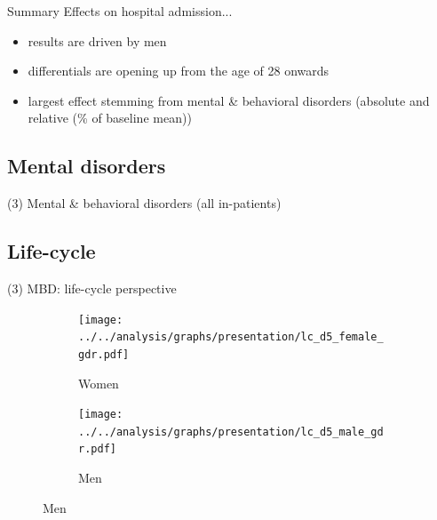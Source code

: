 \documentclass[aspectratio=169,handout]{beamer} %
\begin{document}
\begin{frame}{Summary}
Effects on hospital admission...
	\begin{itemize}	
		\item results are driven by men
		\item differentials are opening up from the age of 28 onwards
		\item largest effect stemming from mental \& behavioral disorders (absolute and relative (\% of baseline mean))
	\end{itemize}	
\end{frame}



\subsection{Mental disorders}\label{MBD_TAB_TOTAL}
\begin{frame}{(3) Mental \& behavioral disorders (all in-patients)}\tiny
	
	\hyperlink{MBD_TAB_WOMEN}{}
\end{frame}	





\subsection{Life-cycle}
\begin{frame}{(3) MBD: life-cycle perspective}
\vspace{1 em}
\vspace{-0.7 em}
\begin{figure}\centering
\begin{subfigure}[h]{0.49\linewidth}\centering\caption{Women}
	\texttt{[image: ../../analysis/graphs/presentation/lc\_d5\_female\_gdr.pdf]}
\end{subfigure}
\begin{subfigure}[h]{0.49\linewidth}\centering\caption{Men}
	\texttt{[image: ../../analysis/graphs/presentation/lc\_d5\_male\_gdr.pdf]}
\end{subfigure}
\end{figure}
\end{frame}


\end{document}

